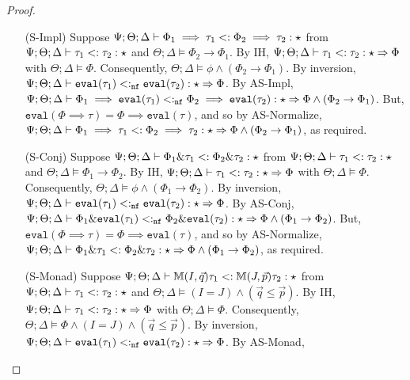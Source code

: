 \begin{proof}
\begin{itemize}
   \item[(S-Impl)] Suppose $\Psi ; \Theta ; \Delta \vdash \Phi_1 \implies \tau_1 <: \Phi_2 \implies \tau_2 : \star$
   from $\Psi ; \Theta ; \Delta \vdash \tau_1 <: \tau_2 : \star$ and $\Theta;\Delta \vDash \Phi_2 \to \Phi_1$. By IH,
   $\Psi ; \Theta ; \Delta \vdash \tau_1 <: \tau_2 : \star \Rightarrow \Phi$ with $\Theta ; \Delta \vDash \Phi$. Consequently, $\Theta ; \Delta \vDash \phi \wedge (\Phi_2 \to \Phi_1)$. By inversion, $\Psi ; \Theta ; \Delta \vdash \texttt{eval}(\tau_1) <:_{\texttt{nf}} \texttt{eval}(\tau_2) : \star \Rightarrow \Phi$. By AS-Impl,
   $\Psi ; \Theta ; \Delta \vdash \Phi_1 \implies \texttt{eval}(\tau_1) <:_{\texttt{nf}} \Phi_2 \implies \texttt{eval}(\tau_2) : \star \Rightarrow \Phi \wedge (\Phi_2 \to \Phi_1)$. But, $\texttt{eval}(\Phi \implies \tau) = \Phi \implies \texttt{eval}(\tau)$, and so by AS-Normalize,
   $\Psi ; \Theta ; \Delta \vdash \Phi_1 \implies \tau_1 <: \Phi_2 \implies \tau_2 : \star \Rightarrow \Phi \wedge (\Phi_2 \to \Phi_1)$, as required.
   \item[(S-Conj)]  Suppose $\Psi ; \Theta ; \Delta \vdash \Phi_1 \& \tau_1 <: \Phi_2 \& \tau_2 : \star$
   from $\Psi ; \Theta ; \Delta \vdash \tau_1 <: \tau_2 : \star$ and $\Theta;\Delta \vDash \Phi_1 \to \Phi_2$. By IH,
   $\Psi ; \Theta ; \Delta \vdash \tau_1 <: \tau_2 : \star \Rightarrow \Phi$ with $\Theta ; \Delta \vDash \Phi$. Consequently, $\Theta ; \Delta \vDash \phi \wedge (\Phi_1 \to \Phi_2)$. By inversion, $\Psi ; \Theta ; \Delta \vdash \texttt{eval}(\tau_1) <:_{\texttt{nf}} \texttt{eval}(\tau_2) : \star \Rightarrow \Phi$. By AS-Conj,
   $\Psi ; \Theta ; \Delta \vdash \Phi_1 \& \texttt{eval}(\tau_1) <:_{\texttt{nf}} \Phi_2 \& \texttt{eval}(\tau_2) : \star \Rightarrow \Phi \wedge (\Phi_1 \to \Phi_2)$. But, $\texttt{eval}(\Phi \implies \tau) = \Phi \implies \texttt{eval}(\tau)$, and so by AS-Normalize,
   $\Psi ; \Theta ; \Delta \vdash \Phi_1 \& \tau_1 <: \Phi_2 \& \tau_2 : \star \Rightarrow \Phi \wedge (\Phi_1 \to \Phi_2)$, as required.
   \item[(S-Monad)] Suppose $\Psi ; \Theta ; \Delta \vdash \mathbb{M}(I,\vec{q}) \tau_1 <: \mathbb{M}(J,\vec{p}) \tau_2 : \star$ from $\Psi ; \Theta ; \Delta \vdash \tau_1 <: \tau_2 : \star$ and $\Theta ; \Delta \vDash (I = J) \wedge (\vec{q} \leq \vec{p})$. By IH, $\Psi ; \Theta ; \Delta \vdash \tau_1 <: \tau_2 : \star \Rightarrow \Phi$ with $\Theta ; \Delta \vDash \Phi$. Consequently, $\Theta ; \Delta \vDash \Phi \wedge (I = J) \wedge (\vec{q} \leq \vec{p})$. By inversion,
   $\Psi ; \Theta ; \Delta \vdash \texttt{eval}(\tau_1) <:_{\texttt{nf}} \texttt{eval}(\tau_2) : \star \Rightarrow \Phi$. By AS-Monad,

\end{itemize}
\end{proof}
